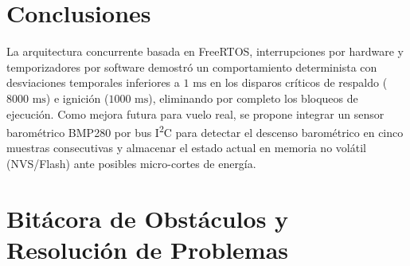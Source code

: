 \documentclass[10pt, letterpaper]{article}
\begin{document}
\section{Conclusiones}
La arquitectura concurrente basada en FreeRTOS, interrupciones por hardware y temporizadores por software demostró un comportamiento determinista con desviaciones temporales inferiores a $1\text{ ms}$ en los disparos críticos de respaldo ($8000\text{ ms}$) e ignición ($1000\text{ ms}$), eliminando por completo los bloqueos de ejecución. Como mejora futura para vuelo real, se propone integrar un sensor barométrico BMP280 por bus I\textsuperscript{2}C para detectar el descenso barométrico en cinco muestras consecutivas y almacenar el estado actual en memoria no volátil (NVS/Flash) ante posibles micro-cortes de energía.

\section{Bitácora de Obstáculos y Resolución de Problemas}
\end{document}
